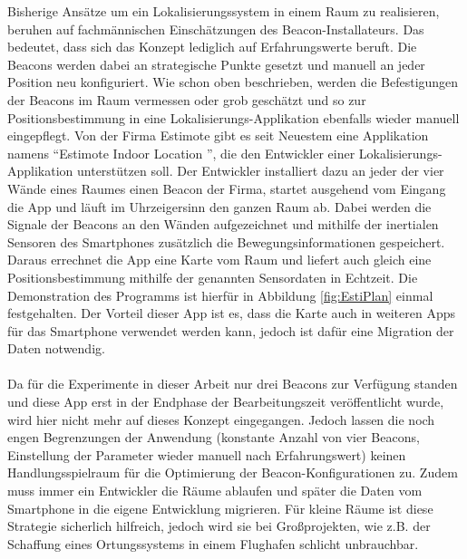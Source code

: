 Bisherige Ansätze um ein Lokalisierungssystem in einem Raum zu realisieren, beruhen auf fachmännischen Einschätzungen des Beacon-Installateurs. Das bedeutet, dass sich das Konzept lediglich auf Erfahrungswerte beruft. Die Beacons werden dabei an strategische Punkte gesetzt und manuell an jeder Position neu konfiguriert. Wie schon oben beschrieben, werden die Befestigungen der Beacons im Raum vermessen oder grob geschätzt und so zur Positionsbestimmung in eine Lokalisierungs-Applikation ebenfalls wieder manuell eingepflegt. Von der Firma Estimote gibt es seit Neuestem eine Applikation namens "`Estimote Indoor Location "', die den Entwickler einer Lokalisierungs-Applikation unterstützen soll. Der Entwickler installiert dazu an jeder der vier Wände eines Raumes einen Beacon der Firma, startet ausgehend vom Eingang die App und läuft im Uhrzeigersinn den ganzen Raum ab. Dabei werden die Signale der Beacons an den Wänden aufgezeichnet und mithilfe der inertialen Sensoren des Smartphones zusätzlich die Bewegungsinformationen gespeichert. Daraus errechnet die App eine Karte vom Raum und liefert auch gleich eine Positionsbestimmung mithilfe der genannten Sensordaten in Echtzeit. Die Demonstration des Programms ist hierfür in Abbildung \ref{fig:EstiPlan} einmal festgehalten. Der Vorteil dieser App ist es, dass die Karte auch in weiteren Apps für das Smartphone verwendet werden kann, jedoch ist dafür eine Migration der Daten notwendig. \\ \\
Da für die Experimente in dieser Arbeit nur drei Beacons zur Verfügung standen und diese App erst in der Endphase der Bearbeitungszeit veröffentlicht wurde, wird hier nicht mehr auf dieses Konzept eingegangen. Jedoch lassen die noch engen Begrenzungen der Anwendung (konstante Anzahl von vier Beacons, Einstellung der Parameter wieder manuell nach Erfahrungswert) keinen Handlungsspielraum für die Optimierung der Beacon-Konfigurationen zu. Zudem muss immer ein Entwickler die Räume ablaufen und später die Daten vom Smartphone in die eigene Entwicklung migrieren. Für kleine Räume ist diese Strategie sicherlich hilfreich, jedoch wird sie bei Großprojekten, wie z.B. der Schaffung eines Ortungssystems in einem Flughafen schlicht unbrauchbar.
